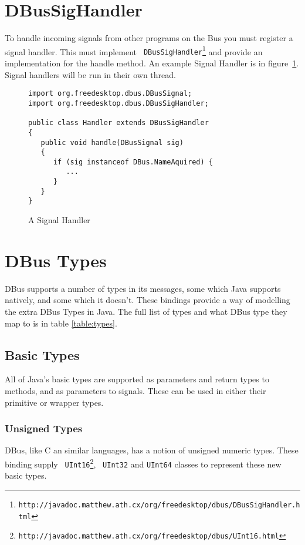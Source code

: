 \documentclass[a4paper,12pt]{article}
\begin{document}
\section{DBusSigHandler}

To handle incoming signals from other programs on the Bus you must
register a signal handler. This must implement {\tt
DBusSigHandler\footnote{http://javadoc.matthew.ath.cx/org/freedesktop/dbus/DBusSigHandler.html}}
and provide an implementation for the handle method. An example Signal Handler is in figure~\ref{fig:handler}. Signal handlers will be run in their own thread.

\begin{figure}[htb]
\begin{center}
\begin{verbatim}
import org.freedesktop.dbus.DBusSignal;
import org.freedesktop.dbus.DBusSigHandler;

public class Handler extends DBusSigHandler
{
   public void handle(DBusSignal sig)
   {
      if (sig instanceof DBus.NameAquired) {
         ...
      }
   }
}
\end{verbatim}
\end{center}
\caption{A Signal Handler}
\label{fig:handler}
\end{figure}


\section{DBus Types}

DBus supports a number of types in its messages, some which Java
supports natively, and some which it doesn't. These bindings provide
a way of modelling the extra DBus Types in Java. The full list of
types and what DBus type they map to is in table \ref{table:types}.

\subsection{Basic Types}

All of Java's basic types are supported as parameters and return types to methods, and as parameters to signals. These can be used in either their primitive or wrapper types.

\subsubsection{Unsigned Types}

DBus, like C an similar languages, has a notion of unsigned numeric
types. These binding supply {\tt
UInt16\footnote{http://javadoc.matthew.ath.cx/org/freedesktop/dbus/UInt16.html}}, {\tt
UInt32} and {\tt UInt64} classes to represent these new basic types.
\end{document}
